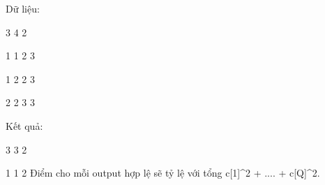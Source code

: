 Dữ liệu:

3 4 2

1 1 2 3

1 2 2 3

2 2 3 3

Kết quả:

3 3 2

1 1 2
Điểm cho mỗi output hợp lệ  sẽ tỷ lệ với tổng c[1]\textasciicircum2 + .... + c[Q]\textasciicircum2.